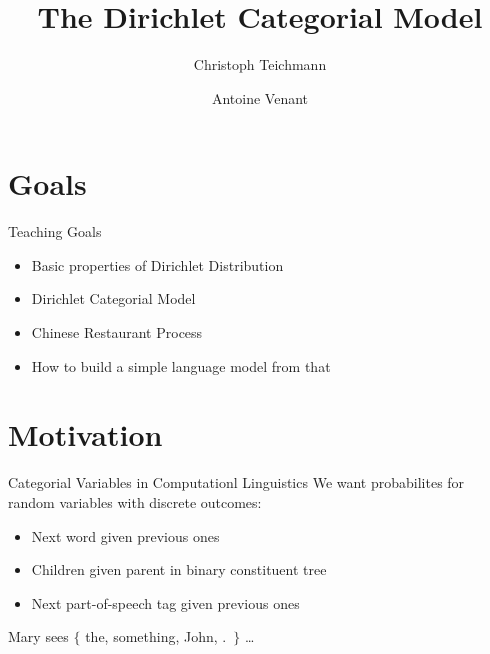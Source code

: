 \documentclass[11pt]{beamer}
\author{Christoph Teichmann \and Antoine Venant}
\title{The Dirichlet Categorial Model}
\subtitle{}
\institute{}
\date{}
\begin{document}
	
	
	\begin{frame}
		\maketitle
	\end{frame}
	
	\section{Goals}
	
	\begin{frame}{Teaching Goals}
		\begin{itemize}
			\item Basic properties of Dirichlet Distribution
			\item Dirichlet Categorial Model
			\item Chinese Restaurant Process
			\item How to build a simple language model from that
		\end{itemize}
	\end{frame}
	
	\section{Motivation}
	
	\begin{frame}{Categorial Variables in Computationl Linguistics}
		\centering
		We want probabilites for random variables with discrete outcomes:
				
		\begin{itemize}
			\item Next word given previous ones
			\item Children given parent in binary constituent tree
			\item Next part-of-speech tag given previous ones
		\end{itemize}
		
		\vspace{20pt} Mary sees $\lbrace$ the, something, John, .\ $\rbrace$ \dots
	\end{frame}
	
\end{document}
